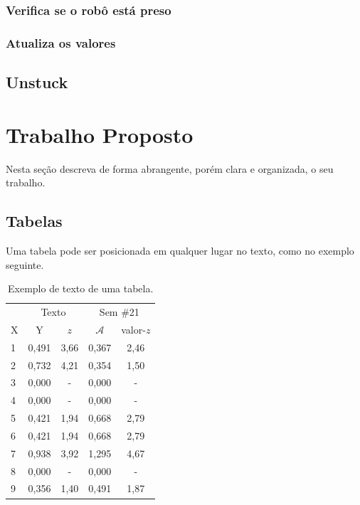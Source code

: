 \documentclass[twoside,conference,a4paper]{IEEEtran}
\begin{document}
  \subsubsection{Verifica se o robô está preso}
  \subsubsection{Atualiza os valores}


\subsection{Unstuck}

\section{Trabalho Proposto}

Nesta seção descreva de forma abrangente, porém clara e organizada, o seu trabalho.

\subsection{Tabelas}

Uma tabela pode ser posicionada em qualquer lugar no texto, como no exemplo
seguinte.
%
\begin{table}[ht]
\renewcommand{\arraystretch}{1.3}
\centering
 \caption{Exemplo de texto de uma tabela.}
 \label{tab:tab1}
 \begin{tabular}{lcccc}\hline
  & \multicolumn{2}{c}{Texto}
  & \multicolumn{2}{c}{Sem \#21} \\ \cline{2-5}
  X & Y & $z$ & $\mathcal{A}$ & valor-$z$ \\ \hline \hline
  1      &0,491  & 3,66   &0,367 &2,46  \\
  2    &0,732  & 4,21   &0,354 &1,50  \\
  3      &0,000  & -      &0,000 & -    \\
  4      &0,000  & -      &0,000 & -  \\
  5      &0,421  & 1,94   &0,668 &2,79  \\
  6      &0,421  & 1,94   &0,668 &2,79  \\
  7      &0,938  & 3,92   &1,295 &4,67 \\
  8       &0,000  & -      &0,000 & - \\
  9       &0,356  & 1,40   &0,491 &1,87 \\ \hline
 \end{tabular}
\end{table}
\end{document}
